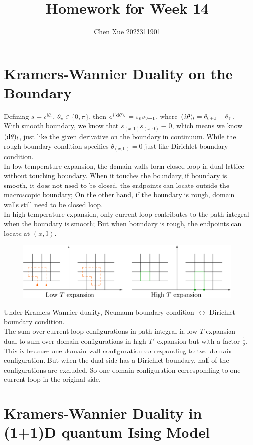 \documentclass[a4paper,11pt]{article}
\title{Homework for Week 14}
\author{Chen Xue  2022311901}
\begin{document}
\maketitle

\section{Kramers-Wannier Duality on the Boundary}
Defining $s = e^{i\theta_v}$, $\theta_v \in \{0, \pi\}$, then $ e^{i ({\rm d}\theta)_l} = s_v s_{v+1}$, where $({\rm d}\theta)_l = \theta_{v+1} - \theta_v$. With smooth boundary, we know that $s_{(x, 1)} s_{(x,0)} \equiv 0$, which means we know $({\rm d}\theta)_l$, just like the given derivative on the boundary in continuum. While the rough boundary condition specifies $\theta_{(x,0)} = 0$ just like Dirichlet boundary condition.\\
In low temperature expansion, the domain walls form closed loop in dual lattice without touching boundary. When it touches the boundary, if boundary is smooth, it does not need to be closed, the endpoints can locate outside the macroscopic boundary; On the other hand, if the boundary is rough, domain walls still need to be closed loop.\\
In high temperature expansion, only current loop contributes to the path integral when the boundary is smooth; But when boundary is rough, the endpoints can locate at $(x,0)$. 
\begin{figure} [h]
    \centering
    \includegraphics[width = \linewidth]{boundary.pdf}
\end{figure}
Under Kramers-Wannier duality, Neumann boundary condition $\longleftrightarrow $ Dirichlet boundary condition.\\
The sum over current loop configurations in path integral in low $T$ expansion dual to sum over domain configurations in high $T'$ expansion but with a factor $\frac{1}{2}$. This is because one domain wall configuration corresponding to two domain configuration. But when the dual side has a Dirichlet boundary, half of the configurations are excluded. So one domain configuration corresponding to one current loop in the original side.

\section{Kramers-Wannier Duality in (1+1)D quantum Ising Model}
\paragraph{}
\end{document}
